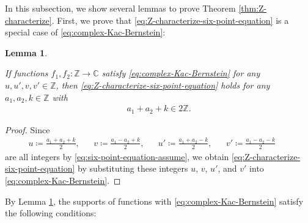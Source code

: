 \documentclass[12pt]{article}
\newtheorem{lemma}[theorem]{Lemma}
\theoremstyle{definition}
\theoremstyle{remark}
\numberwithin{equation}{section}
\numberwithin{figure}{section}
\numberwithin{table}{section}
\begin{document}
In this subsection, we show several lemmas to prove Theorem \ref{thm:Z-characterize}.
First, we prove that \eqref{eq:Z-characterize-six-point-equation} is a special case of \eqref{eq:complex-Kac-Bernstein}:

\begin{lemma}
    \label{lem:six-point-equation}

If functions $ f_1 , f_2 \colon \mathbb{ Z } \to \mathbb{ C } $ satisfy \eqref{eq:complex-Kac-Bernstein} for any $ u , u' , v , v' \in \mathbb{ Z } $, then \eqref{eq:Z-characterize-six-point-equation} holds for any $ a_1 , a_2 , k \in \mathbb{ Z } $ with
\begin{align}
   a_1 + a_2 + k \in 2 \mathbb{ Z }. \label{eq:six-point-equation-assume}
\end{align}

\end{lemma}

\begin{proof}

Since
\begin{align}
  u \coloneqq \frac{ a_1 + a_2 + k }{ 2 }, & &
  v \coloneqq \frac{ a_1 - a_2 + k }{ 2 }, & &
  u' \coloneqq \frac{ a_1 + a_2 - k }{ 2 }, & &
  v' \coloneqq \frac{ a_1 - a_2 - k }{ 2 } & &
\end{align}
are all integers by \eqref{eq:six-point-equation-assume}, we obtain \eqref{eq:Z-characterize-six-point-equation} by substituting these integers $ u $, $ v $, $ u' $, and $ v' $ into \eqref{eq:complex-Kac-Bernstein}.
\end{proof}

By Lemma \ref{lem:six-point-equation}, the supports of functions with \eqref{eq:complex-Kac-Bernstein} satisfy the following conditions:
\end{document}
